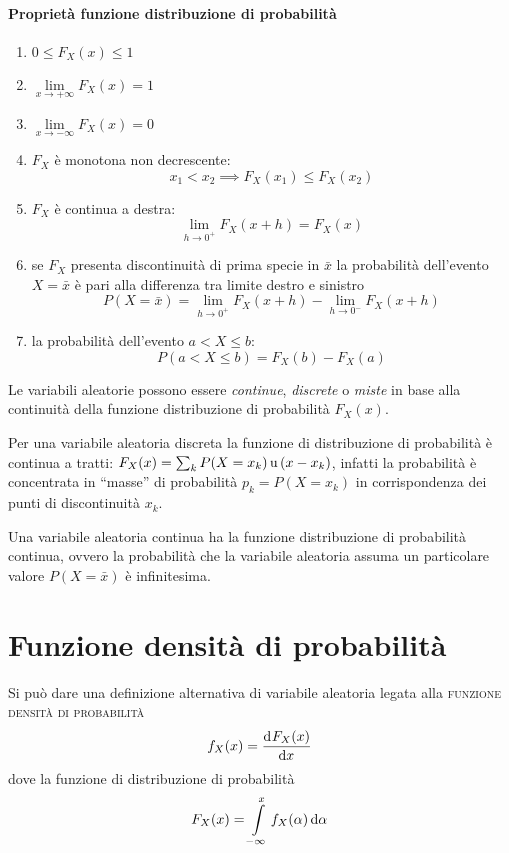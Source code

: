 \paragraph{Proprietà funzione distribuzione di probabilità}
\begin{enumerate}
\item $0\leq F_X(x)\leq 1$
\item $\lim\limits_{x\to+\infty}F_X(x)=1$
\item $\lim\limits_{x\to-\infty}F_X(x)=0$
\item $F_X$ è monotona non decrescente:
\[
	x_1<x_2\implies F_X(x_1)\leq F_X(x_2)
\]
\item $F_X$ è continua a destra:
\[
	\lim\limits_{h\to 0^+}{F_X(x+h)}=F_X(x)
\]
\item se $F_X$ presenta discontinuità di prima specie in $\bar{x}$ la probabilità dell'evento $X=\bar{x}$ è pari alla differenza tra limite destro e sinistro
\[
	P(X=\bar{x})=\lim\limits_{h\to 0^+}{F_X(x+h)} - \lim\limits_{h\to 0^-}{F_X(x+h)}
\]
\item la probabilità dell'evento $a < X \leq b$:
\[
	P(a<X\leq b)=F_X(b)-F_X(a)
\]
\end{enumerate}

Le variabili aleatorie possono essere \emph{continue}, \emph{discrete} o \emph{miste} in base alla continuità della funzione distribuzione di probabilità $F_X(x)$.

Per una variabile aleatoria discreta la funzione di distribuzione di probabilità è continua a tratti: $F_X(x)=\sum_k P(X=x_k)\operatorname{u}{(x-x_k)}$, infatti la probabilità è concentrata in “masse” di probabilità $p_k=P(X=x_k)$ in corrispondenza dei punti di discontinuità $x_k$.

Una variabile aleatoria continua ha la funzione distribuzione di probabilità continua, ovvero la probabilità che la variabile aleatoria assuma un particolare valore $P(X=\bar{x})$ è infinitesima.

\section{Funzione densità di probabilità}
Si può dare una definizione alternativa di variabile aleatoria legata alla \textsc{funzione densità di probabilità}
\begin{equation}
\label{eq:funz_dens_prob}
	f_X(x)=\dfrac{\mathop{}\!\mathrm{d}^{}F_X(x)}{\mathop{}\!\mathrm{d} x^{}}
\end{equation}
dove la funzione di distribuzione di probabilità
\begin{equation}
	F_X(x)=\int\limits_{-\infty}^{x}{f_X(\alpha)}{\,\mathop{}\!\mathrm{d}{\alpha}}
\end{equation}

